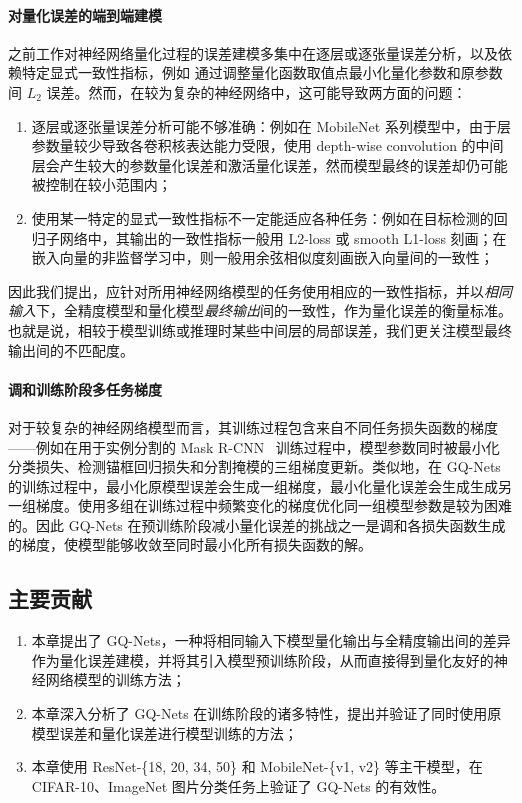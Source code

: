 \documentclass[
  fontset = mac,
]{shtthesis}
\begin{document}
\paragraph{对量化误差的端到端建模}
之前工作对神经网络量化过程的误差建模多集中在逐层或逐张量误差分析，以及依赖特定显式一致性指标，例如 \citet{rastegari2016xnor, cai2017deep} 通过调整量化函数取值点最小化量化参数和原参数间 $L_2$ 误差。然而，在较为复杂的神经网络中，这可能导致两方面的问题：
\begin{enumerate}[1)]
  \item 逐层或逐张量误差分析可能不够准确：例如在 MobileNet 系列模型中，由于层参数量较少导致各卷积核表达能力受限，使用 depth-wise convolution 的中间层会产生较大的参数量化误差和激活量化误差，然而模型最终的误差却仍可能被控制在较小范围内；
  \item 使用某一特定的显式一致性指标不一定能适应各种任务：例如在目标检测的回归子网络中，其输出的一致性指标一般用 L2-loss 或 smooth L1-loss 刻画；在嵌入向量的非监督学习中，则一般用余弦相似度刻画嵌入向量间的一致性；
\end{enumerate}
因此我们提出，应针对所用神经网络模型的任务使用相应的一致性指标，并以\emph{相同输入}下，全精度模型和量化模型\emph{最终输出}间的一致性，作为量化误差的衡量标准。也就是说，相较于模型训练或推理时某些中间层的局部误差，我们更关注模型最终输出间的不匹配度。

\paragraph{调和训练阶段多任务梯度}
对于较复杂的神经网络模型而言，其训练过程包含来自不同任务损失函数的梯度——例如在用于实例分割的 Mask R-CNN~\citep{he2017mask} 训练过程中，模型参数同时被最小化分类损失、检测锚框回归损失和分割掩模的三组梯度更新。类似地，在 GQ-Nets 的训练过程中，最小化原模型误差会生成一组梯度，最小化量化误差会生成生成另一组梯度。使用多组在训练过程中频繁变化的梯度优化同一组模型参数是较为困难的。因此 GQ-Nets 在预训练阶段减小量化误差的挑战之一是调和各损失函数生成的梯度，使模型能够收敛至同时最小化所有损失函数的解。
\subsection{主要贡献}
\begin{enumerate}
  \item 本章提出了 GQ-Nets，一种将相同输入下模型量化输出与全精度输出间的差异作为量化误差建模，并将其引入模型预训练阶段，从而直接得到量化友好的神经网络模型的训练方法；
  \item 本章深入分析了 GQ-Nets 在训练阶段的诸多特性，提出并验证了同时使用原模型误差和量化误差进行模型训练的方法；
  \item 本章使用 ResNet-\{18, 20, 34, 50\} 和 MobileNet-\{v1, v2\} 等主干模型，在 CIFAR-10、ImageNet 图片分类任务上验证了 GQ-Nets 的有效性。
\end{enumerate}
\end{document}

